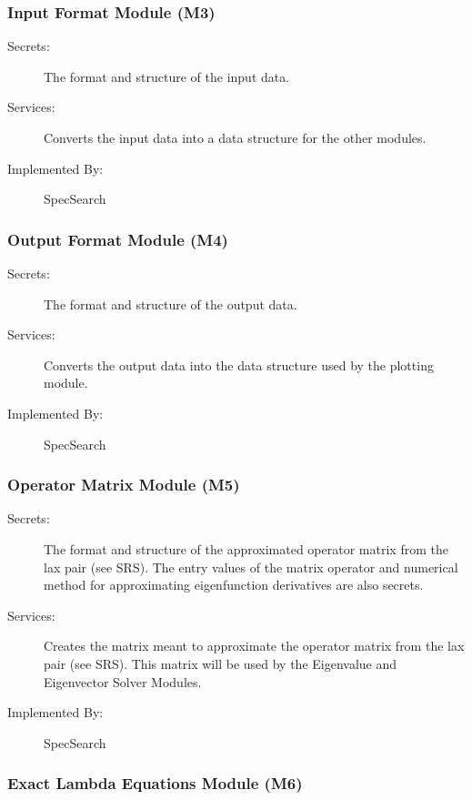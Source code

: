 \documentclass[12pt, titlepage]{article}
\begin{document}
\subsubsection{Input Format Module (M3)}

\begin{description}
\item[Secrets:]The format and structure of the input data.
\item[Services:]Converts the input data into a data structure for the other 
modules.
\item[Implemented By:]SpecSearch 
\end{description} 

\subsubsection{Output Format Module (M4)}

\begin{description}
	\item[Secrets:]The format and structure of the output data.
	\item[Services:]Converts the output data into the data structure used by the
	plotting module. 
	\item[Implemented By:] SpecSearch
\end{description}

\subsubsection{Operator Matrix Module (M5)}

\begin{description}
	\item[Secrets:]The format and structure of the approximated operator matrix 
	from the lax 
	pair (see SRS). The entry values of the matrix operator and numerical 
	method for approximating eigenfunction derivatives are also secrets. 
	\item[Services:]Creates the matrix meant to approximate the operator matrix 
	from the lax pair (see SRS). This matrix will be used by the Eigenvalue and 
	Eigenvector Solver Modules. 
	\item[Implemented By:] SpecSearch
\end{description}

\subsubsection{Exact Lambda Equations Module (M6)}
\end{document}
